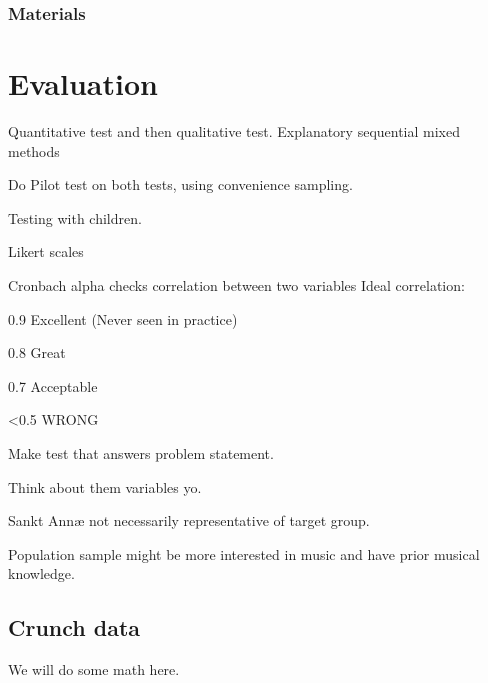 	\subsubsection *{Materials}
	
\section{Evaluation}
Quantitative test and then qualitative test.
Explanatory sequential mixed methods\cite[p.~21]{bjoernerBog}

Do Pilot test on both tests, using convenience sampling.

Testing with children\cite[p.~207]{bjoernerBog}.

Likert scales

Cronbach alpha checks correlation between two variables
Ideal correlation:

0.9 Excellent (Never seen in practice)

0.8 Great

0.7 Acceptable

<0.5 WRONG

Make test that answers problem statement.

Think about them variables yo.

Sankt Annæ not necessarily representative of target group.

Population sample might be more interested in music and have prior musical knowledge.

\subsection{Crunch data}
	We will do some math here.